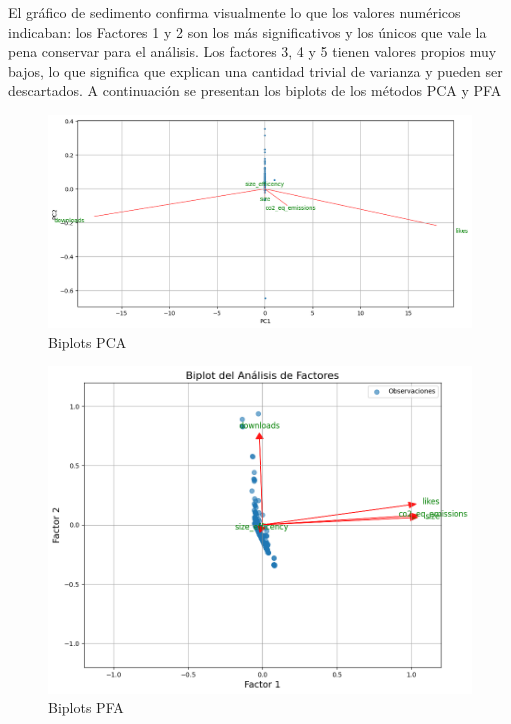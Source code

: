\documentclass[journal]{IEEEtran}
\begin{document}
	El gráfico de sedimento confirma visualmente lo que los valores numéricos indicaban: los Factores 1 y 2 son los más significativos y los únicos que vale la pena conservar para el análisis. Los factores 3, 4 y 5 tienen valores propios muy bajos, lo que significa que explican una cantidad trivial de varianza y pueden ser descartados.
	A continuación se presentan los biplots de los métodos PCA y PFA
	\begin{figure}[H]
		\centering
		\includegraphics[width=0.8\columnwidth]{assets/biplotsPCA.png}
		\caption{Biplots PCA}
		\label{fig:pca_scatter}
	\end{figure}
	
	\begin{figure}[H]
		\centering
		\includegraphics[width=0.8\columnwidth]{assets/biplotsPFA.png}
		\caption{Biplots PFA}
		\label{fig:pca_scatter}
	\end{figure}
\end{document}
